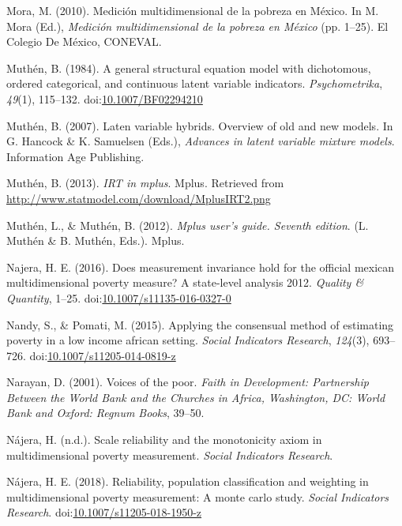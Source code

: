 \documentclass[]{book}
\begin{document}
\leavevmode\hypertarget{ref-Mora2010}{}%
Mora, M. (2010). Medición multidimensional de la pobreza en México. In M. Mora (Ed.), \emph{Medición multidimensional de la pobreza en México} (pp. 1--25). El Colegio De México, CONEVAL.

\leavevmode\hypertarget{ref-Muthen1984}{}%
Muthén, B. (1984). A general structural equation model with dichotomous, ordered categorical, and continuous latent variable indicators. \emph{Psychometrika}, \emph{49}(1), 115--132. doi:\href{https://doi.org/10.1007/BF02294210}{10.1007/BF02294210}

\leavevmode\hypertarget{ref-Muthen2007}{}%
Muthén, B. (2007). Laten variable hybrids. Overview of old and new models. In G. Hancock \& K. Samuelsen (Eds.), \emph{Advances in latent variable mixture models}. Information Age Publishing.

\leavevmode\hypertarget{ref-Muthen2013}{}%
Muthén, B. (2013). \emph{IRT in mplus}. Mplus. Retrieved from \url{http://www.statmodel.com/download/MplusIRT2.png}

\leavevmode\hypertarget{ref-Muthen2012}{}%
Muthén, L., \& Muthén, B. (2012). \emph{Mplus user's guide. Seventh edition}. (L. Muthén \& B. Muthén, Eds.). Mplus.

\leavevmode\hypertarget{ref-Najera2016}{}%
Najera, H. E. (2016). Does measurement invariance hold for the official mexican multidimensional poverty measure? A state-level analysis 2012. \emph{Quality \& Quantity}, 1--25. doi:\href{https://doi.org/10.1007/s11135-016-0327-0}{10.1007/s11135-016-0327-0}

\leavevmode\hypertarget{ref-Nandy2015}{}%
Nandy, S., \& Pomati, M. (2015). Applying the consensual method of estimating poverty in a low income african setting. \emph{Social Indicators Research}, \emph{124}(3), 693--726. doi:\href{https://doi.org/10.1007/s11205-014-0819-z}{10.1007/s11205-014-0819-z}

\leavevmode\hypertarget{ref-Narayan2001}{}%
Narayan, D. (2001). Voices of the poor. \emph{Faith in Development: Partnership Between the World Bank and the Churches in Africa, Washington, DC: World Bank and Oxford: Regnum Books}, 39--50.

\leavevmode\hypertarget{ref-NajeraForthcoming}{}%
Nájera, H. (n.d.). Scale reliability and the monotonicity axiom in multidimensional poverty measurement. \emph{Social Indicators Research}.

\leavevmode\hypertarget{ref-Najera2018}{}%
Nájera, H. E. (2018). Reliability, population classification and weighting in multidimensional poverty measurement: A monte carlo study. \emph{Social Indicators Research}. doi:\href{https://doi.org/10.1007/s11205-018-1950-z}{10.1007/s11205-018-1950-z}
\end{document}
